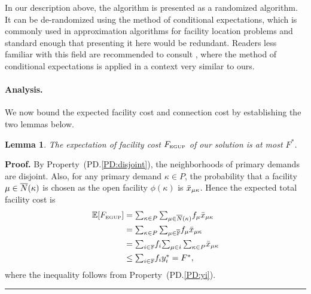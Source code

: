 \documentclass[oneside,final]{ucr}
\newtheorem{lemma}[theorem]{Lemma}
\newenvironment{proof}[1][Proof]{\textbf{#1.} }{\ \rule{0.5em}{0.5em}}
\begin{document}
In our description above, the algorithm is presented as a
randomized algorithm. It can be de-randomized using the
method of conditional expectations, which is commonly used
in approximation algorithms for facility location problems
and standard enough that presenting it here would be
redundant. Readers less familiar with this field are
recommended to consult \cite{ChudakS04}, where the method of
conditional expectations is applied in a context very
similar to ours.


\paragraph{Analysis.}
We now bound the expected facility cost and connection cost
by establishing the two lemmas below.


\begin{lemma}\label{lemma:3fac}
The expectation of facility cost $F_{\mbox{\tiny\rm EGUP}}$ of our solution is
  at most $F^\ast$.
\end{lemma}
\begin{proof}
  By Property~(PD.\ref{PD:disjoint}), the neighborhoods of
  primary demands are disjoint. Also, for any primary demand
  $\kappa\in P$, the probability that a facility
  $\mu\in{\overline{N}}(\kappa)$ is chosen as the open facility
  $\phi(\kappa)$ is ${\bar x}_{\mu\kappa}$. Hence the expected
  total facility cost is
%
\begin{align*}
    \mathbb{E}[F_{\mbox{\tiny\rm EGUP}}]
	&= \textstyle{\sum_{\kappa\in P}\sum_{\mu\in{\overline{N}}(\kappa)}} f_{\mu} {\bar x}_{\mu\kappa}
	\\
	&= \textstyle{\sum_{\kappa\in P}\sum_{\mu\in\overline{\mathbb{F}}}} f_{\mu} {\bar x}_{\mu\kappa} 
	\\
	&= \textstyle{\sum_{i\in\mathbb{F}}} f_i \textstyle{\sum_{\mu\in i}\sum_{\kappa\in P}} {\bar x}_{\mu\kappa} 
	\\
	&\leq \textstyle{\sum_{i\in\mathbb{F}}} f_i y_i^\ast 
	= F^\ast,
\end{align*}
%
where the inequality follows from Property~(PD.\ref{PD:yi}).
\end{proof}

\end{document}
